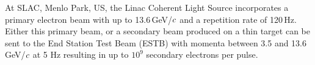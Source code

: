 At SLAC, Menlo Park, US, the Linac Coherent Light Source incorporates a primary electron beam with up to 13.6\,GeV/$\mathnormal{c}$ and a repetition rate of 120\,Hz.
Either this primary beam, or a secondary beam produced on a thin target can be sent to the End Station Test Beam (ESTB) with momenta between 3.5 and 13.6\,GeV/$\mathnormal{c}$ at 5 Hz
 resulting in up to $10^{9}$ secondary electrons per pulse.\,\cite{SLAC}







